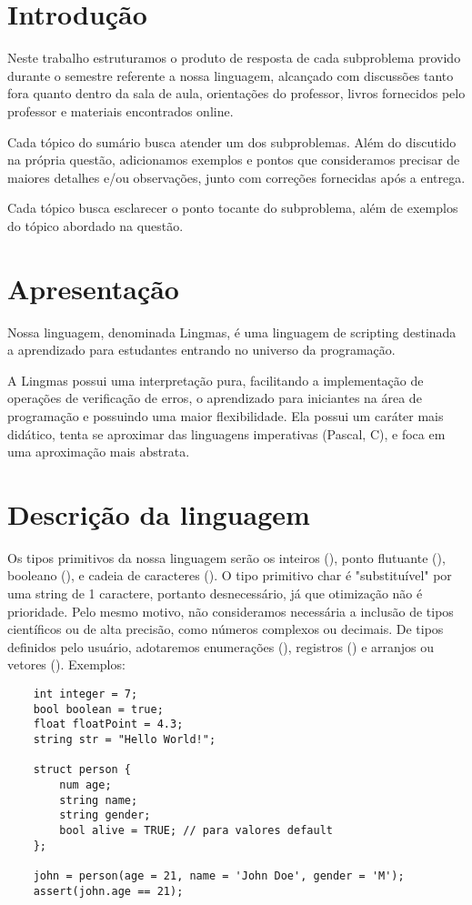 
\section{Introdução}
Neste trabalho estruturamos o produto de resposta de cada subproblema provido
durante o semestre referente a nossa linguagem, alcançado com discussões tanto
fora quanto dentro da sala de aula, orientações do professor, livros fornecidos
pelo professor e materiais encontrados online.

Cada tópico do sumário busca atender um dos subproblemas. Além do discutido na
própria questão, adicionamos exemplos e pontos que consideramos precisar de
maiores detalhes e/ou observações, junto com correções fornecidas após a
entrega.

Cada tópico busca esclarecer o ponto tocante do subproblema, além de exemplos
do tópico abordado na questão.

\section{Apresentação}
Nossa linguagem, denominada Lingmas, é uma linguagem de scripting destinada a
aprendizado para estudantes entrando no universo da programação.

A Lingmas possui uma interpretação pura, facilitando a implementação de
operações de verificação de erros, o aprendizado para iniciantes na área de
programação e possuindo uma maior flexibilidade. Ela possui um caráter mais
didático, tenta se aproximar das linguagens imperativas (Pascal, C), e foca em
uma aproximação mais abstrata.

\section{Descrição da linguagem}
Os tipos primitivos da nossa linguagem serão os inteiros (), ponto flutuante
(), booleano (), e cadeia de caracteres (). O tipo primitivo
char é "substituível" por uma string de 1 caractere, portanto desnecessário, já
que otimização não é prioridade. Pelo mesmo motivo, não consideramos necessária
a inclusão de tipos científicos ou de alta precisão, como números complexos ou
decimais. De tipos definidos pelo usuário, adotaremos enumerações (),
registros () e arranjos ou vetores (). Exemplos:

\begin{lstlisting}
    int integer = 7;
    bool boolean = true;
    float floatPoint = 4.3;
    string str = "Hello World!";

    struct person {
        num age;
        string name;
        string gender;
        bool alive = TRUE; // para valores default
    };

    john = person(age = 21, name = 'John Doe', gender = 'M');
    assert(john.age == 21);
\end{lstlisting}

